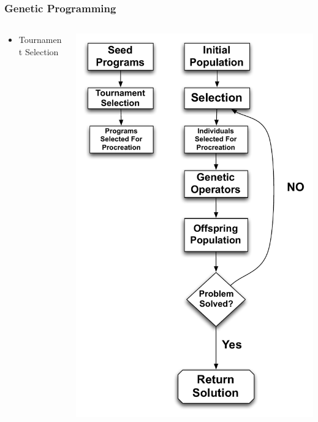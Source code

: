 \documentclass{beamer}
\begin{document}
\begin{frame}
	\frametitle{Genetic Programming}
\begin{columns}
\begin{column}{0.5\textwidth}
\begin{itemize}	
	\item Tournament Selection
	
\end{itemize}
\end{column}
\begin{column}{0.5\textwidth}
   \includegraphics[height=0.90\textheight]{Illustrations/GP2.pdf}
       \\
\end{column}
\end{columns}

\end{frame}
\end{document}

